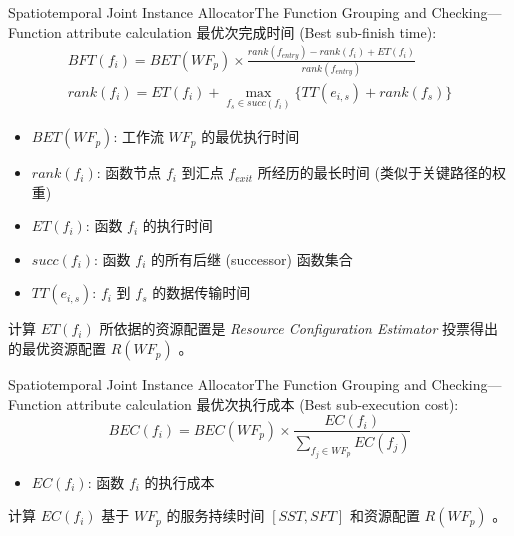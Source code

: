 \documentclass[aspectratio=169]{beamer}
\begin{document}
\begin{frame}{Spatiotemporal Joint Instance Allocator}{The Function Grouping and Checking---Function attribute calculation}
  最优次完成时间 (Best sub-finish time):
  \begin{gather*}
    BFT(f_i) = BET(WF_p) \times \frac{rank(f_{entry}) - rank(f_i) + ET(f_i)}{rank(f_{entry})} \\
    rank(f_i) = ET(f_i) + \max_{f_s \in succ(f_i)} \{TT(e_{i,s}) + rank(f_s)\}
  \end{gather*}
  \begin{itemize}
    \item $BET(WF_p)$: 工作流 $WF_p$ 的最优执行时间
    \item $rank(f_i)$: 函数节点 $f_i$ 到汇点 $f_{exit}$ 所经历的最长时间 (类似于关键路径的权重)
    \item $ET(f_i)$: 函数 $f_i$ 的执行时间
    \item $succ(f_i)$: 函数 $f_i$ 的所有后继 (successor) 函数集合
    \item $TT(e_{i,s})$: $f_i$ 到 $f_s$ 的数据传输时间
  \end{itemize}
  计算 $ET(f_i)$ 所依据的资源配置是 \textit{Resource Configuration Estimator} 投票得出的最优资源配置 $R(WF_p)$ 。
\end{frame}

\begin{frame}{Spatiotemporal Joint Instance Allocator}{The Function Grouping and Checking---Function attribute calculation}
  最优次执行成本 (Best sub-execution cost):
  \begin{equation*}
    BEC(f_i) = BEC(WF_p) \times \frac{EC(f_i)}{\sum_{f_j \in WF_p} EC(f_j)}
  \end{equation*}
  \begin{itemize}
    \item $EC(f_i)$: 函数 $f_i$ 的执行成本
  \end{itemize}
  计算 $EC(f_i)$ 基于 $WF_p$ 的服务持续时间 $[SST, SFT]$ 和资源配置 $R(WF_p)$ 。
\end{frame}
\end{document}
